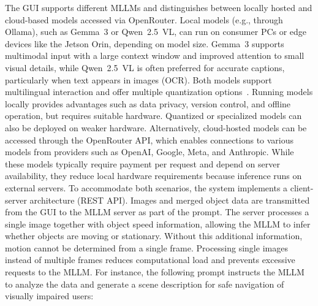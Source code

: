 \documentclass[lettersize,journal]{IEEEtran}
\begin{document}
The GUI supports different MLLMs and distinguishes between locally hosted and cloud-based models accessed via OpenRouter. Local models (e.g., through Ollama), such as Gemma~3 or Qwen~2.5~VL, can run on consumer PCs or edge devices like the Jetson Orin, depending on model size. Gemma~3 supports multimodal input with a large context window and improved attention to small visual details, while Qwen~2.5~VL is often preferred for accurate captions, particularly when text appears in images (OCR). Both models support multilingual interaction and offer multiple quantization options~\cite{gemma3,qwen25vl}. Running models locally provides advantages such as data privacy, version control, and offline operation, but requires suitable hardware. Quantized or specialized models can also be deployed on weaker hardware. Alternatively, cloud-hosted models can be accessed through the OpenRouter API, which enables connections to various models from providers such as OpenAI, Google, Meta, and Anthropic. While these models typically require payment per request and depend on server availability, they reduce local hardware requirements because inference runs on external servers.
To accommodate both scenarios, the system implements a client-server architecture (REST API). Images and merged object data are transmitted from the GUI to the MLLM server as part of the prompt. The server processes a single image together with object speed information, allowing the MLLM to infer whether objects are moving or stationary. Without this additional information, motion cannot be determined from a single frame. Processing single images instead of multiple frames reduces computational load and prevents excessive requests to the MLLM. For instance, the following prompt instructs the MLLM to analyze the data and generate a scene description for safe navigation of visually impaired users:
\noindent
\begin{center} 
\end{center}
\end{document}
